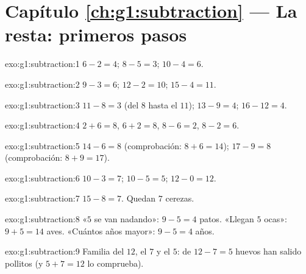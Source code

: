 \section*{Capítulo \ref{ch:g1:subtraction} --- La resta: primeros pasos}

\begin{solution}{exo:g1:subtraction:1}
$6 - 2 = 4$; \quad $8 - 5 = 3$; \quad $10 - 4 = 6$.
\end{solution}

\begin{solution}{exo:g1:subtraction:2}
$9 - 3 = 6$; \quad $12 - 2 = 10$; \quad $15 - 4 = 11$.
\end{solution}

\begin{solution}{exo:g1:subtraction:3}
$11 - 8 = 3$ (del $8$ hasta el $11$); \quad
$13 - 9 = 4$; \quad $16 - 12 = 4$.
\end{solution}

\begin{solution}{exo:g1:subtraction:4}
$2 + 6 = 8$, \quad $6 + 2 = 8$, \quad $8 - 6 = 2$, \quad
$8 - 2 = 6$.
\end{solution}

\begin{solution}{exo:g1:subtraction:5}
$14 - 6 = 8$ (comprobación: $8 + 6 = 14$); \quad
$17 - 9 = 8$ (comprobación: $8 + 9 = 17$).
\end{solution}

\begin{solution}{exo:g1:subtraction:6}
$10 - 3 = 7$; \quad $10 - 5 = 5$; \quad $12 - 0 = 12$.
\end{solution}

\begin{solution}{exo:g1:subtraction:7}
$15 - 8 = 7$. Quedan $7$ cerezas.
\end{solution}

\begin{solution}{exo:g1:subtraction:8}
«$5$ se van nadando»: $9 - 5 = 4$ patos. «Llegan $5$ ocas»:
$9 + 5 = 14$ aves. «Cuántos años mayor»: $9 - 5 = 4$ años.
\end{solution}

\begin{solution}{exo:g1:subtraction:9}
Familia del $12$, el $7$ y el $5$: de $12 - 7 = 5$ huevos han salido pollitos (y
$5 + 7 = 12$ lo comprueba).
\end{solution}
